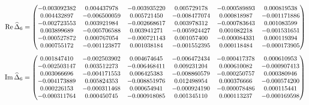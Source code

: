 \[\small \operatorname{Re}\widehat\Delta_6=\begin{pmatrix}
-0.003092382 & 0.004437978 & -0.003935220 & 0.005729178 & -0.000589893 & 0.000819538\\
0.004432897 & -0.006500059 & 0.005721450 & -0.008477074 & 0.000818987 & -0.001171886\\
-0.002723553 & 0.003921984 & -0.002668617 & 0.003978312 & -0.000783643 & 0.001083599\\
0.003899689 & -0.005706588 & 0.003941271 & -0.005924427 & 0.001082218 & -0.001531651\\
-0.000527872 & 0.000767054 & -0.000721143 & 0.001057400 & -0.000084331 & 0.000119394\\
0.000755172 & -0.001123877 & 0.001038184 & -0.001552395 & 0.000118484 & -0.000173905\\
\end{pmatrix}\]
\[\small \operatorname{Im}\widehat\Delta_6=\begin{pmatrix}
0.001847410 & -0.002503902 & 0.004674645 & -0.006472434 & -0.000417378 & 0.000610953\\
-0.002503147 & 0.003512273 & -0.006468411 & 0.009231204 & 0.000610082 & -0.000907413\\
0.003066696 & -0.004171553 & 0.006425383 & -0.008860579 & -0.000250757 & 0.000380946\\
-0.004173889 & 0.005824353 & -0.008851976 & 0.012498954 & 0.000376666 & -0.000574200\\
0.000226153 & -0.000311468 & 0.000654941 & -0.000924190 & -0.000078486 & 0.000115441\\
-0.000311764 & 0.000450745 & -0.000918085 & 0.001345110 & 0.000113237 & -0.000169598\\
\end{pmatrix}\]
